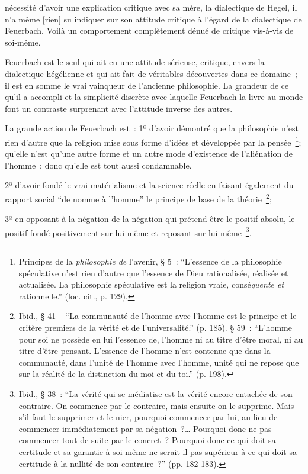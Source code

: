 \documentclass[french,twoside]{book} %
\begin{document}
nécessité d’avoir une explication critique avec sa mère, la dialectique de Hegel, il n’a même [rien] su indiquer sur son attitude critique à l’égard de la dialectique de Feuerbach. Voilà un comportement complètement dénué de critique vis-à-vis de soi-même.\par
Feuerbach est le seul qui ait eu une attitude sérieuse, critique, envers la dialectique hégélienne et qui ait fait de véritables découvertes dans ce domaine ; il est en somme le vrai vainqueur de l’ancienne philosophie. La grandeur de ce qu’il a accompli et la simplicité discrète avec laquelle Feuerbach la livre au monde font un contraste surprenant avec l’attitude inverse des autres.\par
La grande action de Feuerbach est : 1º d’avoir démontré que la philosophie n’est rien d’autre que la religion mise sous forme d’idées et développée par la pensée \footnote{Principes de la \emph{philosophie de} l’avenir, § 5 : “L’essence de la philosophie spéculative n’est rien d’autre que l’essence de Dieu rationalisée, réalisée et actualisée. La philosophie spéculative est la religion vraie, consé\emph{quente et} rationnelle.” (loc. cit., p. 129).}; qu’elle n’est qu’une autre forme et un autre mode d’existence de l’aliénation de l’homme ; donc qu’elle est tout aussi condamnable.\par
2º d’avoir fondé le vrai matérialisme et la science réelle en faisant également du rapport social “de nomme à l’homme” le principe de base de la théorie \footnote{Ibid., § 41 – “La communauté de l’homme avec l’homme est le principe et le critère premiers de la vérité et de l’universalité.” (p. 185). § 59 : “L’homme pour soi ne possède en lui l’essence de, l’homme ni au titre d’être moral, ni au titre d’être pensant. L’essence de l’homme n’est contenue que dans la communauté, dans l’unité de l’homme avec l’homme, unité qui ne repose que sur la réalité de la distinction du moi et du toi.” (p. 198).};\par
3º en opposant à la négation de la négation qui prétend être le positif absolu, le positif fondé positivement sur lui-même et reposant sur lui-même \footnote{Ibid., § 38 : “La vérité qui se médiatise est la vérité encore entachée de son contraire. On commence par le contraire, mais ensuite on le supprime. Mais s’il faut le supprimer et le nier, pourquoi commencer par lui, au lieu de commencer immédiatement par sa négation ?… Pourquoi donc ne pas commencer tout de suite par le concret ? Pourquoi donc ce qui doit sa certitude et sa garantie à soi-même ne serait-il pas supérieur à ce qui doit sa certitude à la nullité de son contraire ?” (pp. 182-183).}.\par
\end{document}
